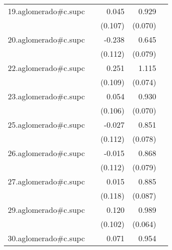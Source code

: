 {\begin{longtable}{l*{4}{D{.}{.}{-1}}}
\addlinespace
19.aglomerado#c.supc&                     &       0.045         &       0.929\sym{***}&                     \\
            &                     &     (0.107)         &     (0.070)         &                     \\
\addlinespace
20.aglomerado#c.supc&                     &      -0.238\sym{*}  &       0.645\sym{***}&                     \\
            &                     &     (0.112)         &     (0.079)         &                     \\
\addlinespace
22.aglomerado#c.supc&                     &       0.251\sym{*}  &       1.115\sym{***}&                     \\
            &                     &     (0.109)         &     (0.074)         &                     \\
\addlinespace
23.aglomerado#c.supc&                     &       0.054         &       0.930\sym{***}&                     \\
            &                     &     (0.106)         &     (0.070)         &                     \\
\addlinespace
25.aglomerado#c.supc&                     &      -0.027         &       0.851\sym{***}&                     \\
            &                     &     (0.112)         &     (0.078)         &                     \\
\addlinespace
26.aglomerado#c.supc&                     &      -0.015         &       0.868\sym{***}&                     \\
            &                     &     (0.112)         &     (0.079)         &                     \\
\addlinespace
27.aglomerado#c.supc&                     &       0.015         &       0.885\sym{***}&                     \\
            &                     &     (0.118)         &     (0.087)         &                     \\
\addlinespace
29.aglomerado#c.supc&                     &       0.120         &       0.989\sym{***}&                     \\
            &                     &     (0.102)         &     (0.064)         &                     \\
\addlinespace
30.aglomerado#c.supc&                     &       0.071         &       0.954\sym{***}&                     \\

\end{longtable}}

